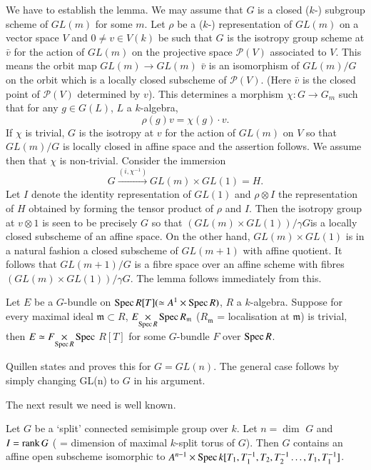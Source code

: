 We have to establish the lemma. We may assume that $G$ is a closed ($k$-) subgroup scheme of $GL(m)$ for some $m$. Let $\rho$ be a ($k$-) representation of $GL(m)$ on a vector space $V$ and $0 \neq v \in V (k)$ be such that $G$ is the isotropy group scheme at $\bar v$ for the action of $GL(m)$ on the projective space $\mathscr{P}(V)$ associated to $V$. This means the orbit map $GL(m) \to GL(m)$ $\bar{v}$ is an isomorphism of $GL(m)/G$ on the orbit which is a locally closed subscheme of $\mathscr{P}(V)$. (Here $\bar{v}$ is the closed point of $\mathscr{P}(V)$ determined by $v$). This determines a morphism $\chi: G \to G_m$ such that for any $g \in G (L)$, $L$ a $k$-algebra,
$$
\rho (g) v = \chi (g) \cdot v. 
$$
If $\chi$ is trivial, $G$ is the isotropy at $v$ for the action of $GL(m)$ on $V$ so that $GL(m)/G$  is locally closed in affine space and the assertion follows. We assume then that $\chi$ is non-trivial. Consider the immersion
$$
G \xrightarrow{(i, \chi^{-1})} GL(m) \times G L(1) = H.
$$
Let $I$ denote the identity representation of $GL(1)$ and $\rho\otimes I$ the representation of $H$ obtained by forming the tensor product of $\rho$ and $I$. Then the isotropy group at $v \otimes 1$ is seen to be precisely $G$ so that $(GL(m) \times GL(1))/ \gamma G$\pageoriginale is a locally closed subscheme of an affine space. On the other hand, $GL(m) \times GL(1)$ is in a natural fashion a closed subscheme of $GL(m+1)$ with affine quotient. It follows that $GL(m+1) /G$ is a fibre space over an affine scheme with fibres $(GL(m) \times GL (1)) / \gamma G$. The lemma follows immediately from this.

\begin{theorem}\label{art17-thm2}
Let $E$ be a $G$-bundle on $\operatorname{Spec} R[T] (\simeq A^1 \times \operatorname{Spec} R)$, $R$ a $k$-algebra. Suppose for every maximal ideal $\mathfrak{m} \subset R$, $\fprod{E}{\Spec}{\Spec R} R_{\mathfrak{m}}$ ($R_{\mathfrak{m}}$ = localisation at $\mathfrak{m}$)  is trivial, then $\fprod{E \simeq F}{\Spec}{\Spec R}$ $R [T]$ for some $G$-bundle $F$ over $\operatorname{Spec} R$.
\end{theorem}

Quillen states and proves this for $G = GL(n)$. The general case follows by simply changing GL(n) to $G$ in his argument.

The next result we need is well known.

\begin{theorem}\label{art17-thm3}
Let $G$ be a `split' connected semisimple group over $k$. Let $n = \dim$ $G$ and $I = \operatorname{rank} G$ ( = dimension of maximal $k$-split torus of $G$). Then $G$ contains an affine open subscheme isomorphic to $A^{n-1} \times \operatorname{Spec} k[T_1, T^{-1}_1, T_2, T_2^{-1} \ldots, T_1, T_1^{-1}]$.
\end{theorem}


